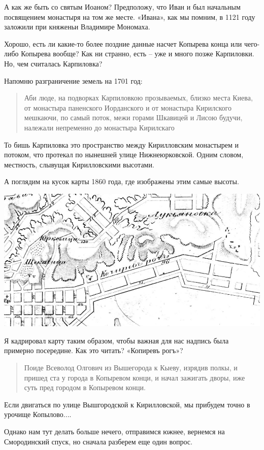 А как же быть со святым Иоаном? Предположу, что Иван и был начальным посвящением монастыря на том же месте. «Ивана», как мы помним, в 1121 году заложили при княженьи Владимире Мономаха.

Хорошо, есть ли какие-то более поздние данные насчет Копырева конца или чего-либо Копырева вообще? Как ни странно, есть – уже и много позже Карпиловки. Но, чем считалась Карпиловка?

Напомню разграничение земель на 1701 год:

\begin{quotation}
Аби люде, на подворках Карпиловкою прозываемых, близко места Киева, от монастыра паненского Иорданского и от монастыра Кирилского мешкаючи, по самый поток, межи горами Шкавицей и Лисою будучи, належали непременно до монастыра Кирилскаго
\end{quotation}

То бишь Карпиловка это пространство между Кирилловским монастырем и потоком, что протекал по нынешней улице Нижнеюрковской. Одним словом, местность, слывущая Кирилловскими высотами.

А поглядим на кусок карты 1860 года, где изображены этим самые высоты.

\begin{center}
\includegraphics[width=\linewidth]{chast-zmiy/kopyl/1860.png}
\end{center}

Я кадрировал карту таким образом, чтобы важная для нас надпись была примерно посередине. Как это читать? «Копиревъ рогъ»? 

\begin{quotation}
Поиде Всеволод Олгович из Вышегорода к Кыеву, изрядив полкы, и пришед ста у города в Копыревом конци, и начал зажигать дворы, иже суть пред городом в Копыревом конци.\end{quotation}

Если двигаться по улице Вышгородской к Кирилловской, мы прибудем точно в урочище Копылово.... 

Однако нам тут делать больше нечего, отправимся южнее, вернемся на Смородинский спуск, но сначала разберем еще один вопрос.